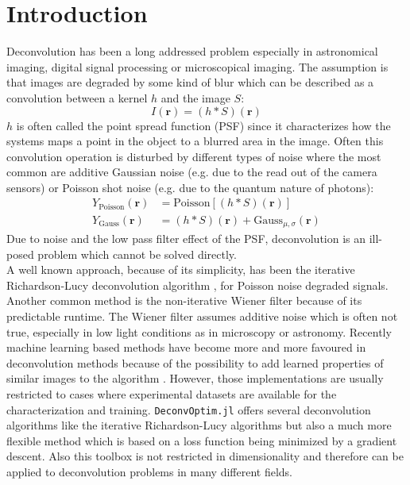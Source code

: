 \documentclass{juliacon}
\begin{document}
\section{Introduction}
Deconvolution has been a long addressed problem especially in astronomical imaging, digital signal processing or microscopical imaging.
The assumption is that images are degraded by some kind of blur which can be described as a convolution between a kernel $h$ and the image $S$:
\begin{equation}
    I(\mathbf r) = (h * S)(\mathbf r)
\end{equation}
$h$ is often called the point spread function (PSF) since it characterizes how the systems maps a point in the object to a blurred area
in the image.
Often this convolution operation is disturbed by different types of noise where the most common are additive Gaussian noise (e.g. due to the read out of the camera sensors) or Poisson shot noise (e.g. due to the quantum nature of photons):
\begin{align}
    Y_{\text{Poisson}}(\mathbf r) &= \text{Poisson}[(h * S)(\mathbf r)]\\
    Y_{\text{Gauss}}(\mathbf r) &= (h * S)(\mathbf r) + \text{Gauss}_{\mu, \sigma}(\mathbf r)
\end{align}
Due to noise and the low pass filter effect of the PSF, deconvolution is an ill-posed problem which cannot be solved directly.\\
A well known approach, because of its simplicity, has been the iterative Richardson-Lucy deconvolution algorithm \cite{Richardson:72}, \cite{lucy:74} for Poisson noise degraded signals.
Another common method is the non-iterative Wiener filter \cite{wiener2013extrapolation} because of its predictable runtime.
The Wiener filter assumes additive noise which is often not true, especially in low light conditions as in microscopy or astronomy. 
Recently machine learning based methods have become more and more favoured in deconvolution methods because
of the possibility to add learned properties of similar images to the algorithm \cite{Kruse_2017_ICCV}.
However, those implementations are usually restricted to cases where experimental datasets are available for the characterization and training.
\verb|DeconvOptim.jl| offers several deconvolution algorithms like the iterative Richardson-Lucy algorithms but also
a much more flexible method which is based on a loss function being minimized by a gradient descent.
Also this toolbox is not restricted in dimensionality and therefore can be applied to deconvolution problems in many different fields.
\end{document}

